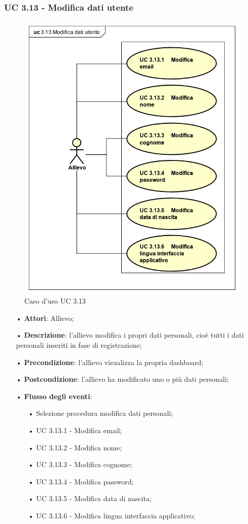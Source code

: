\subsubsection{UC 3.13 - Modifica dati utente}
\begin{figure}[H]
	\centering
	\includegraphics[width=13cm]{img/modificadatiutenteallievo.png} 
	\caption{Caso d'uso UC 3.13}\label{fig:312}
\end{figure}
\begin{itemize}
\item[•] \textbf{Attori}: Allievo;
\item[•] \textbf{Descrizione}: l'allievo modifica i propri dati personali, cioè tutti i dati personali inseriti in fase di registrazione;
\item[•] \textbf{Precondizione}: l'allievo visualizza la propria dashboard;
\item[•] \textbf{Postcondizione}: l'allievo ha modificato uno o più dati personali;
\item[•] \textbf{Flusso degli eventi}:
\begin{enumerate}
	\item[•] Selezione procedura modifica dati personali;
	\item[•] UC 3.13.1 - Modifica email;
	\item[•] UC 3.13.2 - Modifica nome;
	\item[•] UC 3.13.3 - Modifica cognome;
	\item[•] UC 3.13.4 - Modifica password;
	\item[•] UC 3.13.5 - Modifica data di nascita;
	\item[•] UC 3.13.6 - Modifica lingua
	 interfaccia applicativo;
\end{enumerate}
\end{itemize}


